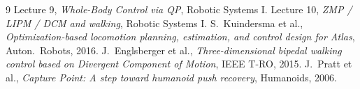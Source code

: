 \documentclass[11pt]{article}
\begin{document}
\begin{thebibliography}{9}
 Lecture 9, \emph{Whole-Body Control via QP}, Robotic Systems I.
 Lecture 10, \emph{ZMP / LIPM / DCM and walking}, Robotic Systems I.
 S.~Kuindersma et al., \emph{Optimization-based locomotion
  planning, estimation, and control design for Atlas}, Auton.\ Robots, 2016.
 J.~Englsberger et al., \emph{Three-dimensional bipedal
  walking control based on Divergent Component of Motion}, IEEE T-RO, 2015.
 J.~Pratt et al., \emph{Capture Point: A step toward humanoid push
  recovery}, Humanoids, 2006.
\end{thebibliography}
\end{document}
